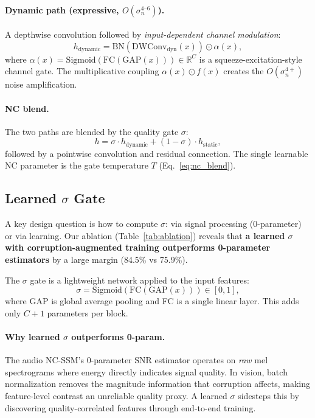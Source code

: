 \documentclass[10pt,twocolumn,letterpaper]{article}
\begin{document}
\paragraph{Dynamic path (expressive, $O(\sigma_n^{4\text{--}6})$).}
A depthwise convolution followed by \emph{input-dependent channel modulation}:
\begin{equation}
h_{\text{dynamic}} = \text{BN}(\text{DWConv}_{\text{dyn}}(x)) \odot \alpha(x),
\end{equation}
where $\alpha(x) = \text{Sigmoid}(\text{FC}(\text{GAP}(x))) \in \mathbb{R}^C$ is a squeeze-excitation-style~\cite{hu2018squeeze} channel gate.
The multiplicative coupling $\alpha(x) \odot f(x)$ creates the $O(\sigma_n^{4+})$ noise amplification.

\paragraph{NC blend.}
The two paths are blended by the quality gate $\sigma$:
\begin{equation}
h = \sigma \cdot h_{\text{dynamic}} + (1 - \sigma) \cdot h_{\text{static}},
\end{equation}
followed by a pointwise convolution and residual connection.
The single learnable NC parameter is the gate temperature $T$ (Eq.~\ref{eq:nc_blend}).

\subsection{Learned $\sigma$ Gate}
\label{sec:quality}

A key design question is how to compute $\sigma$: via signal processing (0-parameter) or via learning.
Our ablation (Table~\ref{tab:ablation}) reveals that \textbf{a learned $\sigma$ with corruption-augmented training outperforms 0-parameter estimators} by a large margin (84.5\% vs 75.9\%).

The $\sigma$ gate is a lightweight network applied to the input features:
\begin{equation}
\sigma = \text{Sigmoid}\!\left(\text{FC}\!\left(\text{GAP}(x)\right)\right) \in [0, 1],
\label{eq:sigma}
\end{equation}
where GAP is global average pooling and FC is a single linear layer.
This adds only $C + 1$ parameters per block.

\paragraph{Why learned $\sigma$ outperforms 0-param.}
The audio NC-SSM's 0-parameter SNR estimator operates on \emph{raw} mel spectrograms where energy directly indicates signal quality.
In vision, batch normalization removes the magnitude information that corruption affects, making feature-level contrast an unreliable quality proxy.
A learned $\sigma$ sidesteps this by discovering quality-correlated features through end-to-end training.
\end{document}
